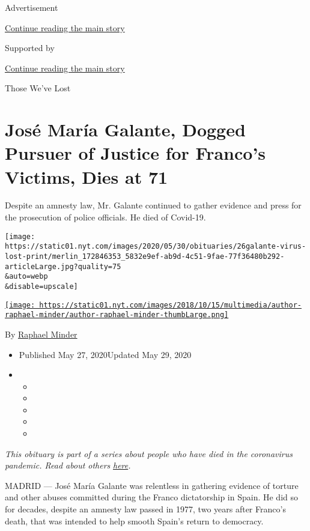 Advertisement

\protect\hyperlink{after-top}{Continue reading the main story}

Supported by

\protect\hyperlink{after-sponsor}{Continue reading the main story}

Those We've Lost

\hypertarget{josuxe9-maruxeda-galante-dogged-pursuer-of-justice-for-francos-victims-dies-at-71}{%
\section{José María Galante, Dogged Pursuer of Justice for Franco's
Victims, Dies at
71}\label{josuxe9-maruxeda-galante-dogged-pursuer-of-justice-for-francos-victims-dies-at-71}}

Despite an amnesty law, Mr. Galante continued to gather evidence and
press for the prosecution of police officials. He died of Covid-19.

\texttt{[image: https://static01.nyt.com/images/2020/05/30/obituaries/26galante-virus-lost-print/merlin\_172846353\_5832e9ef-ab9d-4c51-9fae-77f36480b292-articleLarge.jpg?quality=75\\\&auto=webp\\\&disable=upscale]}

\href{https://www.nytimes.com/by/raphael-minder}{\texttt{[image: https://static01.nyt.com/images/2018/10/15/multimedia/author-raphael-minder/author-raphael-minder-thumbLarge.png]}}

By \href{https://www.nytimes.com/by/raphael-minder}{Raphael Minder}

\begin{itemize}
\item
  Published May 27, 2020Updated May 29, 2020
\item
  \begin{itemize}
  \item
  \item
  \item
  \item
  \item
  \end{itemize}
\end{itemize}

\emph{This obituary is part of a series about people who have died in
the coronavirus pandemic. Read about others}
\href{https://www.nytimes.com/interactive/2020/obituaries/people-died-coronavirus-obituaries.html}{\emph{here}}\emph{.}

MADRID --- José María Galante was relentless in gathering evidence of
torture and other abuses committed during the Franco dictatorship in
Spain. He did so for decades, despite an amnesty law passed in 1977, two
years after Franco's death, that was intended to help smooth Spain's
return to democracy.

